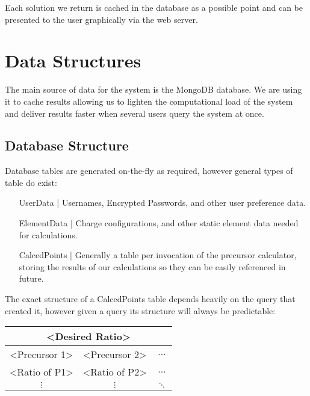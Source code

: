 Each solution we return is cached in the database as a possible point and can be presented to the user graphically via the web server.

\pagebreak
\section{Data Structures}

The main source of data for the system is the MongoDB database. We are using it to cache results allowing us to lighten the computational load of the system and deliver results faster when several users query the system at once.

\subsection{Database Structure}
Database tables are generated on-the-fly as required, however general types of table do exist:

\begin{enumerate}[label = {}, leftmargin=\widthof{CalcedPoints |}+\labelsep]
	\item[UserData |] Usernames, Encrypted Passwords, and other user preference data.
	
	\item[ElementData |] Charge configurations, and other static element data needed for calculations.
	
	\item[CalcedPoints |] Generally a table per invocation of the precursor calculator, storing the results of our calculations so they can be easily referenced in future. 
\end{enumerate}

The exact structure of a CalcedPoints table depends heavily on the query that created it, however given a query its structure will always be predictable: 

\begin{table}[h!]
	\centering
	\begin{tabular}{|c|c|c|}
		\hline
		\multicolumn{3}{|c|}{\textless{}Desired Ratio\textgreater{}} \\ \hline
		\textless{}Precursor 1\textgreater{} & \textless{}Precursor 2\textgreater{} & $\dots$ \\ \hline
		\textless{}Ratio of P1\textgreater{} & \textless{}Ratio of P2\textgreater{} & $\dots$ \\
		$\vdots$ & $\vdots$ & $\ddots$ \\
	\end{tabular}
\end{table}

